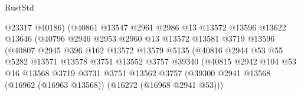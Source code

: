 \begin{lexlean}{RustStd}
\begin{coremodule}
                                      @23317
                                      @40186)
                                    (@40861
                                      @13547
                                      @2961
                                      @2986
                                      @13
                                      @13572
                                      @13596
                                      @13622
                                      @13646
                                      (@40796
                                        @2946
                                        @2953
                                        @2960
                                        @13
                                        @13572
                                        @13581
                                        @3719
                                        @13596
                                        (@40807
                                          @2945
                                          @396
                                          @162
                                          @13572
                                          @13579
                                          @5135
                                          (@40816
                                            @2944
                                            @53
                                            @55
                                            @5282
                                            @13571
                                            @13578
                                            @3751
                                            @13552
                                            @3757
                                            @39340
                                            (@40815
                                              @2942
                                              @104
                                              @53
                                              @16
                                              @13568
                                              @3719
                                              @3731
                                              @3751
                                              @13562
                                              @3757
                                              (@39300
                                                @2941
                                                @13568
                                                (@16962 (@16963 @13568))
                                                (@16272 (@16968 @2941 @53)))

\end{coremodule}
\end{lexlean}
